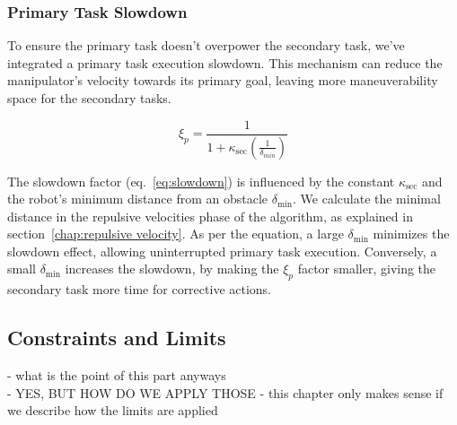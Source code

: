 \documentclass[]{article}
\begin{document}
\subsubsection{Primary Task Slowdown}
\label{chap:primary slowdown}

To ensure the primary task doesn't overpower the secondary task, we've integrated a primary task execution slowdown. This mechanism can reduce the manipulator's velocity towards its primary goal, leaving more maneuverability space for the secondary tasks.

\begin{equation}
	\label{eq:slowdown}
	\xi_{p}=
	\frac{1}{1 + \kappa_{\text{sec}} \left(\frac{1}{\delta_{min}}\right)}
\end{equation}

The slowdown factor (eq.~\ref{eq:slowdown}) is influenced by the constant \( \kappa_{\text{sec}} \) and the robot's minimum distance from an obstacle \( \delta_{\text{min}} \). We calculate the minimal distance in the repulsive velocities phase of the algorithm, as explained in section~\ref{chap:repulsive velocity}. As per the equation, a large \( \delta_{\text{min}} \) minimizes the slowdown effect, allowing uninterrupted primary task execution. Conversely, a small \( \delta_{\text{min}} \) increases the slowdown, by making the $\xi_{p}$ factor smaller, giving the secondary task more time for corrective actions.





\subsection{Constraints and Limits}

\alert{
	- what is the point of this part anyways \\
	- YES, BUT HOW DO WE APPLY THOSE - this chapter only makes sense if we describe how the limits are applied \\
}

\end{document}
